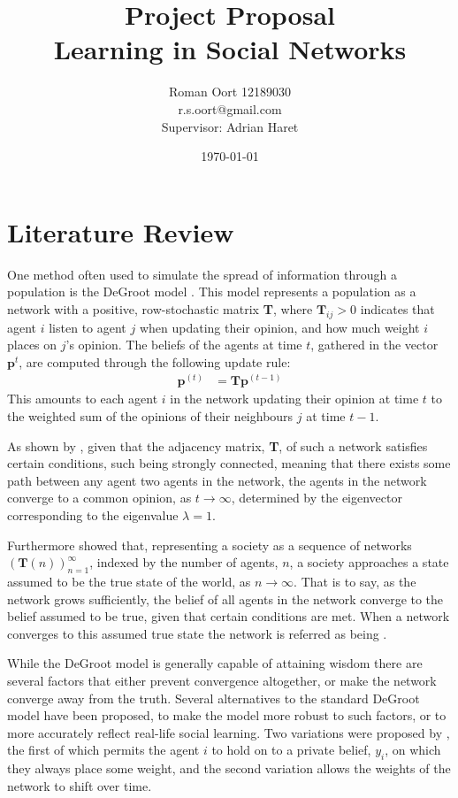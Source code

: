\documentclass{article}
\title{Project Proposal \\ Learning in Social Networks}
\author{Roman Oort 12189030\\ r.s.oort@gmail.com\\[1cm]{\normal Supervisor: Adrian Haret}}
\date{\today}
\begin{document}
\maketitle
\newpage
\section*{Literature Review}
One method often used to simulate the spread of information through a population is the DeGroot model \cite{degroot1974concensus} \cite{jackson2010social}. This model represents a population as a network with a positive, row-stochastic matrix \textbf{T}, where $\textbf{T}_{ij}>0$ indicates that agent $i$ listen to agent $j$ when updating their opinion, and how much weight $i$ places on $j$'s opinion. The beliefs of the agents at time $t$, gathered in the vector $\textbf{p}^{t}$, are computed through the following update rule:
\begin{align*}
    \textbf{p}^{(t)} &= \textbf{T}\textbf{p}^{(t-1)}
\end{align*}
This amounts to each agent $i$ in the network updating their opinion at time $t$ to the weighted sum of the opinions of their neighbours $j$ at time $t-1$.

As shown by \cite{degroot1974concensus}, given that the adjacency matrix, \textbf{T}, of such a network satisfies certain conditions, such being strongly connected, meaning that there exists some path between any agent two agents in the network, the agents in the network converge to a common opinion, as $t \to \infty$, determined by the eigenvector corresponding to the eigenvalue $\lambda = 1$.

Furthermore \cite{golub2010naive} showed that, representing a society as a sequence of networks $(\textbf{T}(n))_{n=1}^{\infty}$, indexed by the number of agents, $n$, a society approaches a state assumed to be the true state of the world, as $n \to \infty$. That is to say, as the network grows sufficiently, the belief of all agents in the network converge to the belief assumed to be true, given that certain conditions are met. When a network converges to this assumed true state the network is referred as being .

While the DeGroot model is generally capable of attaining wisdom there are several factors that either prevent convergence altogether, or make the network converge away from the truth. Several alternatives to the standard DeGroot model have been proposed, to make the model more robust to such factors, or to more accurately reflect real-life social learning.
Two variations were proposed by \cite{golub2017learning}, the first of which permits the agent $i$ to hold on to a private belief, $y_i$, on which they always place some weight, and the second variation allows the weights of the network to shift over time.
\end{document}
